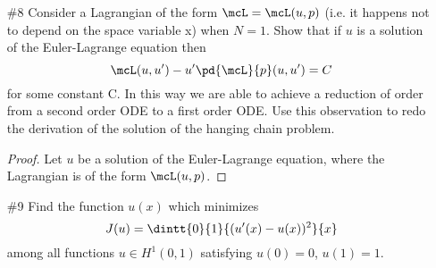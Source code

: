 \documentclass[11pt, oneside]{article}
\begin{document}
\begin{enumerate}
\begin{proof}
      Now assuming that $\Omega$ has smooth enough boundaries, the
      Rellich-Kondrachov theorem states that $\set{u_k}$ is precompact in
      $L^2(\Omega)$.
      Therefore there exists some convergent subsequence $\set{u_{k_j}}$ in
      $L^2(\Omega)$.
      Let $u$ be the limit of the subsequence $\set{u_{k_j}}$, that is
      $\lim[j \to \infty]{u_{k_j}} = u$.
      Note that since $\norm[L^2(\Omega)]{\nabla u_{k_j}} \le \frac{1}{k_j}$,
      this implies that $\norm[L^2(\Omega)]{\nabla u_{k_j}} \to 0$.
      Now since $u_{k_j} \to u$ this implies that $\nabla u_{k_j} \to \nabla u$.
      This along with the fact that $\norm[L^2(\Omega)]{\nabla u_{k_j}} \to 0$,
      shows that $\nabla u_{k_j} \to 0 = \nabla u$.
      This shows that $u$ is a cons 
    \end{proof}

  \pagebreak
  \item[\#8]
    Consider a Lagrangian of the form $\mcL = \mcL(u, p)$ (i.e. it happens not
    to depend on the space variable x) when $N = 1$.
    Show that if $u$ is a solution of the Euler-Lagrange equation then
    \[
      \mcL(u, u') - u' \pd{\mcL}{p}(u, u') = C
    \]
    for some constant C.
    In this way we are able to achieve a reduction of order from a second order
    ODE to a first order ODE.
    Use this observation to redo the derivation of the solution of the hanging
    chain problem.

    \begin{proof}
      Let $u$ be a solution of the Euler-Lagrange equation, where the Lagrangian
      is of the form $\mcL(u, p)$.
    \end{proof}

  \pagebreak
  \item[\#9] %
    Find the function $u(x)$ which minimizes
    \[
      J(u) = \dintt{0}{1}{(u'(x) - u(x))^2}{x}
    \]
    among all functions $u \in H^1(0, 1)$ satisfying $u(0) = 0$, $u(1) = 1$.


\end{enumerate}
\end{document}
